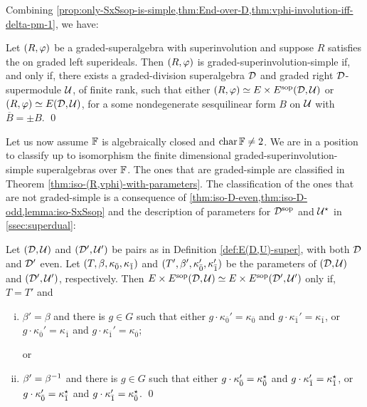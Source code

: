 
Combining \cref{prop:only-SxSsop-is-simple,thm:End-over-D,thm:vphi-involution-iff-delta-pm-1}, we have:

\begin{cor}\label{cor:SxSsop-with-dcc}
    Let $(R, \varphi)$ be a graded-superalgebra with superinvolution and suppose $R$ satisfies the \dcc on graded left superideals. 
    Then $(R, \varphi)$ is graded-superinvolution-simple if, and only if, there exists a graded-division superalgebra $\mathcal{D}$ and graded right $\mathcal{D}$-supermodule $\mathcal U$, of finite rank, such that either
    $(R, \varphi) \simeq E\times E^{\mathrm{sop}} (\mathcal{D}, \mathcal U)$ or $(R, \varphi) \simeq E(\mathcal{D}, \mathcal U)$, for a some nondegenerate sesquilinear form $B$ on $\mathcal U$ with $\overline{B} = \pm B$. \qed
\end{cor}

Let us now assume $\mathbb{F}$ is algebraically closed and $\operatorname{char} \mathbb{F} \neq 2$. 
We are in a position to classify up to isomorphism the finite dimensional graded-superinvolution-simple  superalgebras over $\mathbb{F}$. 
The ones that are graded-simple are classified in Theorem \ref{thm:iso-(R,vphi)-with-parameters}. 
The classification of the ones that are not graded-simple is a consequence of \cref{thm:iso-D-even,thm:iso-D-odd,lemma:iso-SxSsop} and the description of parameters for $\mathcal{D}^{\mathrm{sop}}$ and $\mathcal U^\star$ in \cref{ssec:superdual}:

\begin{thm}\label{thm:iso-D-even-ExEsop}
	Let $(\mathcal{D}, \mathcal U)$ and $(\mathcal{D}', \mathcal U')$ be pairs as in Definition \ref{def:E(D,U)-super}, with both $\mathcal{D}$ and $\mathcal{D}'$ even. 
	Let $(T, \beta, \kappa_{\bar{0}}, \kappa_{\bar{1}})$ and $(T', \beta', \kappa_{\bar{0}}', \kappa_{\bar{1}}')$ be the parameters of $(\mathcal{D}, \mathcal U)$ and $(\mathcal{D}', \mathcal U')$, respectively. 
	Then $E\times E^{\mathrm{sop}}(\mathcal{D}, \mathcal U) \simeq E\times E^{\mathrm{sop}}(\mathcal{D}', \mathcal U')$ only if, $T=T'$ and
	\begin{enumerate}[(i)]
	    \item $\beta'=\beta$ and there is $g\in G$ such that either $g \cdot \kappa_{\bar 0}'=\kappa_{\bar 0}$ and $g \cdot \kappa_{\bar 1}'=\kappa_{\bar 1}$, or $g \cdot \kappa_{\bar 0}'=\kappa_{\bar 1}$ and $g \cdot \kappa_{\bar 1}'=\kappa_{\bar 0}$;
	    
	    or
	    \item $\beta'=\beta^{-1}$ and there is $g\in G$ such that either $g \cdot \kappa_{\bar 0}'=\kappa_{\bar 0}^\star$ and $g \cdot \kappa_{\bar 1}'=\kappa_{\bar 1}^\star$, or $g \cdot \kappa_{\bar 0}'=\kappa_{\bar 1}^\star$ and $g \cdot \kappa_{\bar 1}'=\kappa_{\bar 0}^\star$. \qed
	\end{enumerate}
\end{thm}


